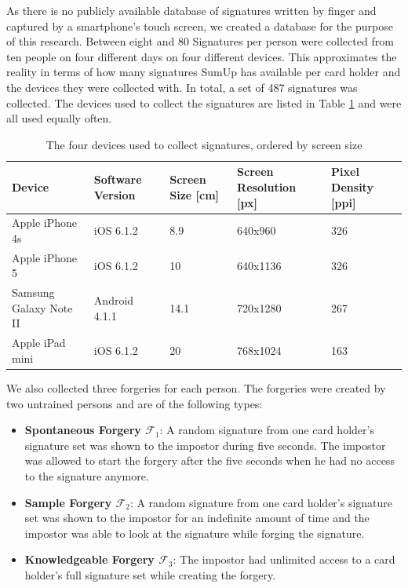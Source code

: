 \documentclass[a4paper, oneside]{csthesis}
\begin{document}
As there is no publicly available database of signatures written by finger and captured by a smartphone's touch screen, we created a database for the purpose of this research.
Between eight and 80 Signatures per person were collected from ten people on four different days on four different devices. This approximates the reality in terms of how many signatures SumUp has available per card holder and the devices they were collected with. In total, a set of 487 signatures was collected.
The devices used to collect the signatures are listed in Table \ref{tbl:signatures-devices} and were all used equally often.

\begin{table}[tb]
    \begin{center}
        \begin{tabular}{p{1.75cm}|p{2cm}p{2cm}p{2cm}p{2cm}}
        \hline

        \hline
        \textbf{Device} & \textbf{Software Version} & \textbf{Screen Size [cm]} & \textbf{Screen Resolution [px]} & \textbf{Pixel Density [ppi]} \\
        \hline
        Apple iPhone 4s & iOS 6.1.2 & 8.9 & 640x960 & 326 \\
        \hdashline[0.5pt/3pt]
        Apple iPhone 5 & iOS 6.1.2 & 10 & 640x1136 & 326 \\
        \hdashline[0.5pt/3pt]
        Samsung Galaxy Note II & Android 4.1.1 & 14.1 & 720x1280 & 267 \\
        \hdashline[0.5pt/3pt]
        Apple iPad mini & iOS 6.1.2 & 20 & 768x1024 & 163\\
        \hline
        \end{tabular}
    \end{center}
    \caption{The four devices used to collect signatures, ordered by screen size}
    \label{tbl:signatures-devices}
\end{table}

We also collected three forgeries for each person. The forgeries were created by two untrained persons and are of the following types:

\begin{itemize}
\item \textbf{Spontaneous Forgery $\mathcal{F}_1$}: A random signature from one card holder's  signature set was shown to the impostor during five seconds. The impostor was allowed to start the forgery after the five seconds when he had no access to the signature anymore.
\item \textbf{Sample Forgery $\mathcal{F}_2$}: A random signature from one card holder's signature set was shown to the impostor for an indefinite amount of time and the impostor was able to look at the signature while forging the signature.
\item \textbf{Knowledgeable Forgery $\mathcal{F}_3$}: The impostor had unlimited access to a card holder's full signature set while creating the forgery.
\end{itemize}
\end{document}
